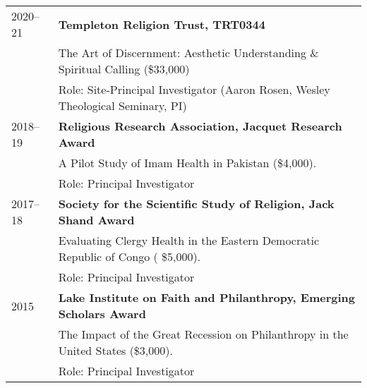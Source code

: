 \begin{longtable}{p{} p{}}

2020--21 & \textbf{Templeton Religion Trust, TRT0344} \\
& The Art of Discernment: Aesthetic Understanding \& Spiritual Calling (\$33,000)\\
& Role: Site-Principal Investigator (Aaron Rosen, Wesley Theological Seminary, PI)\\


2018--19 & \textbf{Religious Research Association, Jacquet Research Award}\\
& A Pilot Study of Imam Health in Pakistan (\$4,000). \\
& Role: Principal Investigator\\

2017--18 & \textbf{Society for the Scientific Study of Religion, Jack Shand Award} \\
& Evaluating Clergy Health in the Eastern Democratic Republic of Congo ( \$5,000). \\
& Role: Principal Investigator\\


2015 & \textbf{Lake Institute on Faith and Philanthropy, Emerging Scholars Award} \\
& The Impact of the Great Recession on Philanthropy in the United States (\$3,000). \\
& Role: Principal Investigator\\
\end{longtable}

